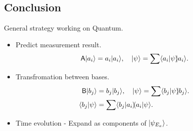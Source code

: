 \documentclass{article}
\newcommand*{\op}[1]{\mathsf{#1}}
\newcommand{\ko}[1]{\hspace{-#1 pt}}
\begin{document}
\subsection{Conclusion}
General strategy working on Quantum.
\begin{itemize}
	\item Predict measurement result.
	      $$\op{A}\ket{a_i}=a_i\ket{a_i},\quad\ket\psi=\sum\brkt{a_i}\psi\ko3\ket{a_i}.$$
	\item Transfromation between bases.
	      \begin{align*}
		      \op{B}\ket{b_j}   & =b_j\ket{b_j},\quad\ket\psi=\sum\brkt{b_j}\psi\ko3\ket{b_j}. \\
		      \brkt{b_j}\psi & =\sum\brkt{b_j}{a_i}\ko3\brkt{a_i}\psi.
	      \end{align*}
	\item Time evolution - Expand as components of $\lvert\psi_{E_a}\rangle$.
\end{itemize}
\clearpage
\end{document}
